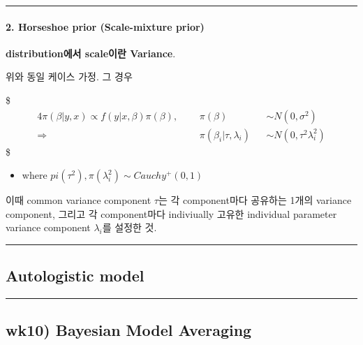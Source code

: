 \documentclass[
]{book}
\providecommand{\tightlist}{%
  \setlength{\itemsep}{0pt}\setlength{\parskip}{0pt}}
\begin{document}
\begin{center}\rule{0.5\linewidth}{0.5pt}\end{center}

\hypertarget{horseshoe-prior-scale-mixture-prior}{%
\paragraph{2. Horseshoe prior (Scale-mixture prior)}\label{horseshoe-prior-scale-mixture-prior}}

\textbf{distribution에서 scale이란 Variance}.

위와 동일 케이스 가정. 그 경우

\$
\begin{alignat}{4}

\pi(\beta \vert y, x) \propto f(y \vert x, \beta) \pi(\beta), \; \; \; \; \; &\pi(\beta) && \sim N(0, \sigma^2) \\
 
\Longrightarrow &\pi(\beta_i \vert \tau, \lambda_i) && \sim N(0, \tau^2 \lambda_i^2) 

\end{alignat}
\$

\begin{itemize}
\tightlist
\item
  where \(pi(\tau^2), \pi(\lambda_i^2) \sim Cauchy^{+}(0,1)\)
\end{itemize}

이때 common variance component \(\tau\)는 각 component마다 공유하는 1개의 variance component, 그리고 각 component마다 indiviually 고유한 individual parameter variance component \(\lambda_i\)를 설정한 것.

\begin{center}\rule{0.5\linewidth}{0.5pt}\end{center}

\hypertarget{autologistic-model}{%
\subsection{Autologistic model}\label{autologistic-model}}

\begin{center}\rule{0.5\linewidth}{0.5pt}\end{center}

\hypertarget{wk10-bayesian-model-averaging}{%
\subsection{wk10) Bayesian Model Averaging}\label{wk10-bayesian-model-averaging}}
\end{document}
